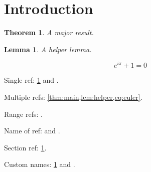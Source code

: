 \documentclass{article}
\newtheorem{theorem}{Theorem}
\newtheorem{lemma}{Lemma}
\begin{document}
\section{Introduction}\label{sec:intro}

\begin{theorem}\label{thm:main}
A major result.
\end{theorem}

\begin{lemma}\label{lem:helper}
A helper lemma.
\end{lemma}

\begin{equation}\label{eq:euler}
e^{i\pi} + 1 = 0
\end{equation}

\noindent
Single ref: \cref{thm:main} and .

\noindent
Multiple refs: \cref{thm:main,lem:helper,eq:euler}.

\noindent
Range refs: .

\noindent
Name of ref:  and .

\noindent
Section ref: \cref{sec:intro}.

\noindent
Custom names: \cref{thm:main} and .
\end{document}
